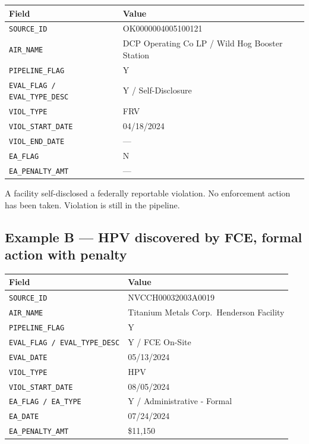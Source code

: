 \documentclass[11pt]{article}
\begin{document}
\begin{table}[H]
\centering
\begin{tabular}{ll}
\toprule
Field & Value \\
\midrule
\texttt{SOURCE\_ID} & OK0000004005100121 \\
\texttt{AIR\_NAME} & DCP Operating Co LP / Wild Hog Booster Station \\
\texttt{PIPELINE\_FLAG} & Y \\
\texttt{EVAL\_FLAG / EVAL\_TYPE\_DESC} & Y / Self-Disclosure \\
\texttt{VIOL\_TYPE} & FRV \\
\texttt{VIOL\_START\_DATE} & 04/18/2024 \\
\texttt{VIOL\_END\_DATE} & --- \\
\texttt{EA\_FLAG} & N \\
\texttt{EA\_PENALTY\_AMT} & --- \\
\bottomrule
\end{tabular}
\end{table}

\noindent A facility self-disclosed a federally reportable violation. No enforcement action has been taken. Violation is still in the pipeline.

\subsection*{Example B --- HPV discovered by FCE, formal action with penalty}

\begin{table}[H]
\centering
\begin{tabular}{ll}
\toprule
Field & Value \\
\midrule
\texttt{SOURCE\_ID} & NVCCH00032003A0019 \\
\texttt{AIR\_NAME} & Titanium Metals Corp.\ Henderson Facility \\
\texttt{PIPELINE\_FLAG} & Y \\
\texttt{EVAL\_FLAG / EVAL\_TYPE\_DESC} & Y / FCE On-Site \\
\texttt{EVAL\_DATE} & 05/13/2024 \\
\texttt{VIOL\_TYPE} & HPV \\
\texttt{VIOL\_START\_DATE} & 08/05/2024 \\
\texttt{EA\_FLAG / EA\_TYPE} & Y / Administrative - Formal \\
\texttt{EA\_DATE} & 07/24/2024 \\
\texttt{EA\_PENALTY\_AMT} & \$11,150 \\
\bottomrule
\end{tabular}
\end{table}
\end{document}
